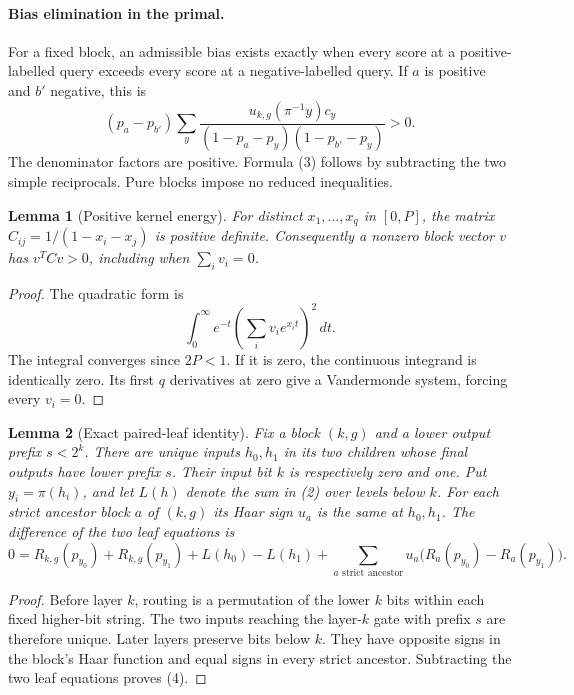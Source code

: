 \documentclass[11pt]{article}
\newtheorem{lemma}{Lemma}
\begin{document}
\paragraph{Bias elimination in the primal.}
For a fixed block, an admissible bias exists exactly when every score
at a positive-labelled query exceeds every score at a negative-labelled
query. If $a$ is positive and $b'$ negative, this is
\[
 (p_a-p_{b'})\sum_y
 \frac{u_{k,g}(\pi^{-1}y)c_y}
 {(1-p_a-p_y)(1-p_{b'}-p_y)}>0.                       \tag{3}
\]
The denominator factors are positive. Formula (3) follows by subtracting
the two simple reciprocals. Pure blocks impose no reduced inequalities.

\begin{lemma}[Positive kernel energy]
For distinct $x_1,\ldots,x_q$ in $[0,P]$, the matrix
$C_{ij}=1/(1-x_i-x_j)$ is positive definite. Consequently a nonzero
block vector $v$ has $v^TCv>0$, including when $\sum_i v_i=0$.
\end{lemma}
\begin{proof}
The quadratic form is
\[
 \int_0^\infty e^{-t}\left(\sum_i v_i e^{x_it}\right)^2\,dt.
\]
The integral converges since $2P<1$. If it is zero, the continuous
integrand is identically zero. Its first $q$ derivatives at zero give
a Vandermonde system, forcing every $v_i=0$.
\end{proof}

\begin{lemma}[Exact paired-leaf identity]
Fix a block $(k,g)$ and a lower output prefix $s<2^k$. There are unique
inputs $h_0,h_1$ in its two children whose final outputs have lower
prefix $s$. Their input bit $k$ is respectively zero and one. Put
$y_i=\pi(h_i)$, and let $L(h)$ denote the sum in (2) over levels below
$k$. For each strict ancestor block $a$ of $(k,g)$ its Haar sign
$u_a$ is the same at $h_0,h_1$. The difference of the two leaf equations
is
\[
 0=R_{k,g}(p_{y_0})+R_{k,g}(p_{y_1})
   +L(h_0)-L(h_1)
   +\sum_{a\text{ strict ancestor}}u_a
       \bigl(R_a(p_{y_0})-R_a(p_{y_1})\bigr).        \tag{4}
\]
\end{lemma}
\begin{proof}
Before layer $k$, routing is a permutation of the lower $k$ bits
within each fixed higher-bit string. The two inputs reaching the
layer-$k$ gate with prefix $s$ are therefore unique. Later layers
preserve bits below $k$. They have opposite signs in the block's Haar
function and equal signs in every strict ancestor. Subtracting the two
leaf equations proves (4).
\end{proof}
\end{document}
